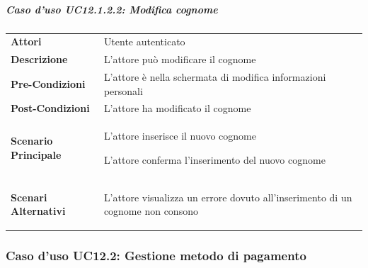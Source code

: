 \subparagraph{Caso d'uso UC12.1.2.2: Modifica cognome}
\label{UC12_1_2_2}
\begin{minipage}{\linewidth}
	\begin{tabular}{ l | p{11cm}}
		\hline
		\rowcolor{Gray}
		\multicolumn{2}{c}{UC12.1.2.2 - Modifica cognome} \\
		\hline
		\textbf{Attori} & Utente autenticato \\
		\textbf{Descrizione} & L'attore può modificare il cognome\\
		\textbf{Pre-Condizioni} & L'attore è nella schermata di modifica informazioni personali\\
		\textbf{Post-Condizioni} & L'attore ha modificato il cognome \\
		\textbf{Scenario Principale} & 
		\begin{enumerate*}[label=(\arabic*.),itemjoin={\newline}]
			\item L'attore inserisce il nuovo cognome
			\item L'attore conferma l'inserimento del nuovo cognome
		\end{enumerate*}\\
		\textbf{Scenari Alternativi} & 
		\begin{enumerate*}[label=(\arabic*.),itemjoin={\newline}]
			\item L'attore visualizza un errore dovuto all'inserimento di un cognome non consono
		\end{enumerate*}
	\end{tabular}
\end{minipage}

\subsubsection{Caso d'uso UC12.2: Gestione metodo di pagamento}
\label{UC12_2}

